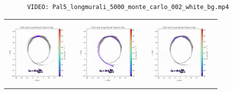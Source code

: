         \begin{verbatim}
            VIDEO: Pal5_longmurali_5000_monte_carlo_002_white_bg.mp4
        \end{verbatim}

        \begin{figure}
            \centering
            \begin{tabular}{ccc}
                \includegraphics[width=.32\linewidth]{images/frame_0002.png}&
                \includegraphics[width=.32\linewidth]{images/frame_0004.png}&
                \includegraphics[width=.32\linewidth]{images/frame_0008.png}\\
                

\end{tabular}
\end{figure}
